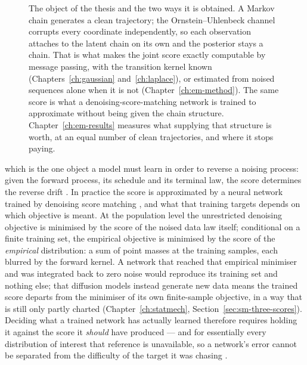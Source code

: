 \begin{figure}[t]
\caption[What this thesis computes, and the comparison it makes]{The object of
the thesis and the two ways it is obtained. A Markov chain generates a clean
trajectory; the Ornstein--Uhlenbeck channel corrupts every coordinate
independently, so each observation attaches to the latent chain on its own and
the posterior stays a chain. That is what makes the joint score exactly
computable by message passing, with the transition kernel known
(Chapters~\ref{ch:gaussian} and~\ref{ch:laplace}), or estimated from noised
sequences alone when it is not (Chapter~\ref{ch:em-method}). The same score is
what a denoising-score-matching network is trained to approximate without being
given the chain structure. Chapter~\ref{ch:em-results} measures what supplying
that structure is worth, at an equal number of clean trajectories, and where
it stops paying.}
\label{fig:thesis-pipeline}
\end{figure}

which is the one object a model must learn in order to reverse a noising
process: given the forward process, its schedule and its terminal law, the score
determines the reverse drift \citep{anderson1982reverse}. In practice the score is approximated by a neural network trained by denoising
score matching \citep{hyvarinen2005estimation, vincent2011connection}, and
what that training targets depends on which objective is meant. At the
population level the unrestricted denoising objective is minimised by the
score of the noised data law itself; conditional on a finite training set,
the empirical objective is minimised by the score of the \emph{empirical}
distribution: a sum of point masses at the training samples, each blurred by
the forward kernel. A network that reached that empirical minimiser and was
integrated
back to zero noise would reproduce its training set and nothing else; that
diffusion models instead generate new data means the trained score departs from
the minimiser of its own finite-sample objective, in a way that is still only
partly charted
(Chapter~\ref{ch:statmech}, Section~\ref{sec:sm-three-scores}). Deciding what a
trained network has actually learned therefore requires holding it against the
score it \emph{should} have produced --- and for essentially every distribution
of interest that reference is unavailable, so a network's error cannot be
separated from the difficulty of the target it was chasing
\citep{kadkhodaie2024generalization}.

